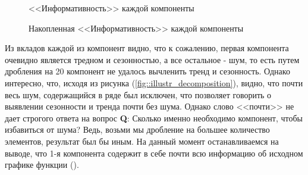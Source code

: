 \begin{figure}[H]
	\centering
	\caption{<<Информативность>> каждой компоненты}
\end{figure}

\begin{figure}[H]
	\centering
	\caption{Накопленная <<Информативность>> каждой компоненты}
\end{figure}
Из вкладов каждой из компонент видно, что к сожалению, первая компонента очевидно является тредном и сезонностью, а все остальное - шум, то есть путем дробления на 20 компонент не удалось вычленить тренд и сезонность. Однако интересно, что, исходя из рисунка (\ref{fig::illustr_decomposition}), видно, что почти весь шум, содержащийся в ряде был исключен, что позволяет говорить о выявлении сезонности и тренда почти без шума. Однако слово <<почти>> не дает строгого ответа на вопрос \textbf{Q}:  Сколько именно необходимо компонент, чтобы избавиться от шума? Ведь, возьми мы дробление на большее количество элементов, результат был бы иным. На данный момент останавливаемся на выводе, что 1-я компонента содержит в себе почти всю информацию об исходном графике функции (). 

